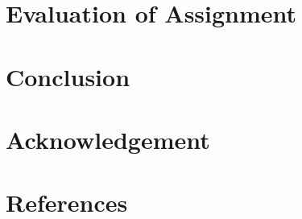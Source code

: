 \documentclass{article}
\begin{document}


\part{Evaluation of Assignment}



\part{Conclusion}



\part{Acknowledgement}



\part{References}



{}

\nocite{*}
\end{document}
